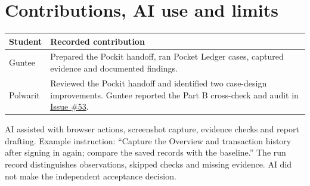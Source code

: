 \documentclass[11pt,a4paper]{article}
\newcommand{\issue}[1]{\href{https://github.com/CPE334-Pockit/Pockit/issues/#1}{Issue \##1}}
\begin{document}
\section{Contributions, AI use and limits}
\begin{tabularx}{\linewidth}{lX}
Student & Recorded contribution \\\hline
Guntee & Prepared the Pockit handoff, ran Pocket Ledger cases, captured evidence and documented findings. \\
Polwarit & Reviewed the Pockit handoff and identified two case-design improvements. Guntee reported the Part B cross-check and audit in \issue{53}. \\
\end{tabularx}

AI assisted with browser actions, screenshot capture, evidence checks and report drafting. Example instruction: ``Capture the Overview and transaction history after signing in again; compare the saved records with the baseline.'' The run record distinguishes observations, skipped checks and missing evidence. AI did not make the independent acceptance decision.
\end{document}
